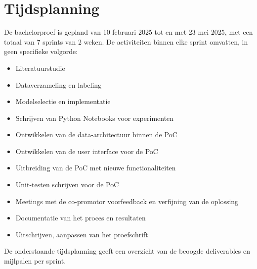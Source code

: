 \section{Tijdsplanning}
De bachelorproef is gepland van 10 februari 2025 tot en met 23 mei 2025, met een totaal van 7 sprints van 2 weken.
De activiteiten binnen elke sprint omvatten, in geen specifieke volgorde:
\begin{itemize}
    \item Literatuurstudie
    \item Dataverzameling en labeling
    \item Modelselectie en implementatie
    \item Schrijven van Python Notebooks voor experimenten
    \item Ontwikkelen van de data-architectuur binnen de PoC
    \item Ontwikkelen van de user interface voor de PoC
    \item Uitbreiding van de PoC met nieuwe functionaliteiten
    \item Unit-testen schrijven voor de PoC
    \item Meetings met de co-promotor voor\newline feedback en verfijning van de oplossing
    \item Documentatie van het proces en resultaten
    \item Uitschrijven, aanpassen van het proefschrift
\end{itemize}
\par
De onderstaande tijdsplanning geeft een overzicht van de beoogde deliverables en mijlpalen per sprint.

